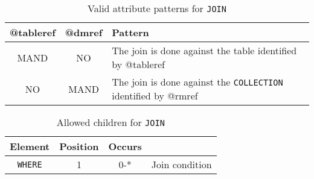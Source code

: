\begin{table}[!htbp]
\small
\centering
\begin{tabulary}{\linewidth}{|c|c|J|}
    \hline 
        \textbf{@tableref} &
        \textbf{@dmref} &
        \textbf{Pattern}\\
    \hline      \hline  
        MAND &           
        NO &           
        The join is done against the table identified by @tableref \\
    \hline   
        NO &           
        MAND &           
        The join is done against the \texttt{COLLECTION} identified by @rmref \\
   \hline 
\end{tabulary}
     \caption{Valid attribute patterns for  \texttt{JOIN}}
     \label{tbl:join-pattern}
\end{table}


\begin{table}[!htbp]
\small
\centering
\begin{tabulary}{\linewidth}{|c |c |c|J|}
    \hline 
        \textbf{Element} &
        \textbf{Position} &
        \textbf{Occurs} &
        \\
    \hline      \hline  
        \texttt{WHERE}  &        
        1 &           
        0-* &
         Join condition\\
    \hline 
\end{tabulary}
     \caption{Allowed children for \texttt{JOIN}} 
     \label{tbl:join-chilren}
 \end{table}